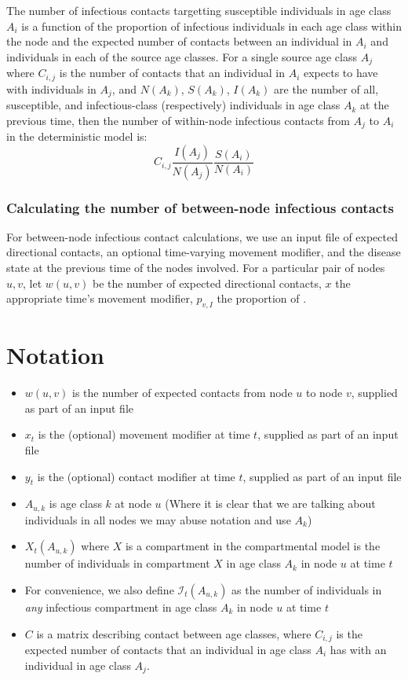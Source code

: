 \documentclass[11pt]{article}
\begin{document}
The number of infectious contacts targetting susceptible individuals in age class $A_i$ is a function of the proportion of infectious individuals in each age class within the node and the expected number of contacts between an individual in $A_i$ and individuals in each of the source age classes. For a single source age class $A_j$ where $C_{i,j}$ is the number of contacts that an individual in $A_i$ expects to have with individuals in $A_j$, and $N(A_k)$, $S(A_k)$, $I(A_k)$ are the number of all, susceptible, and infectious-class (respectively) individuals in age class $A_k$ at the previous time, then the number of within-node infectious contacts from $A_j$ to $A_i$ in the deterministic model is: 
$$
C_{i,j}\frac{I(A_j)}{N(A_j)}\frac{S(A_i)}{N(A_i)}
$$

\subsubsection{Calculating the number of between-node infectious contacts}

For between-node infectious contact calculations, we use an input file of expected directional contacts, an optional time-varying movement modifier, and the disease state at the previous time of the nodes involved.  For a particular pair of nodes $u, v$, let $w(u, v)$ be the number of expected directional contacts, $x$ the appropriate time's movement modifier, $p_{v,I}$ the proportion of .  

\section{Notation}

\begin{itemize}
\item $w(u, v)$ is the number of expected contacts from node $u$ to node $v$, supplied as part of an input file
\item $x_t$ is the (optional) movement modifier at time $t$, supplied as part of an input file
\item $y_t$ is the (optional) contact modifier at time $t$, supplied as part of an input file
\item $A_{u,k}$ is age class $k$ at node $u$ (Where it is clear that we are talking about individuals in all nodes we may abuse notation and use $A_k$)
\item $X_t(A_{u,k})$ where $X$ is a compartment in the compartmental model is the number of individuals in compartment $X$ in age class $A_k$ in node $u$ at time $t$
\item For convenience, we also define $\mathcal{I}_t(A_{u,k})$ as the number of individuals in \emph{any} infectious compartment in age class $A_k$ in node $u$ at time $t$
\item $C$ is a matrix describing contact between age classes, where $C_{i,j}$ is the expected number of contacts that an individual in age class $A_i$ has with an individual in age class $A_j$.
\end{itemize}
\end{document}
